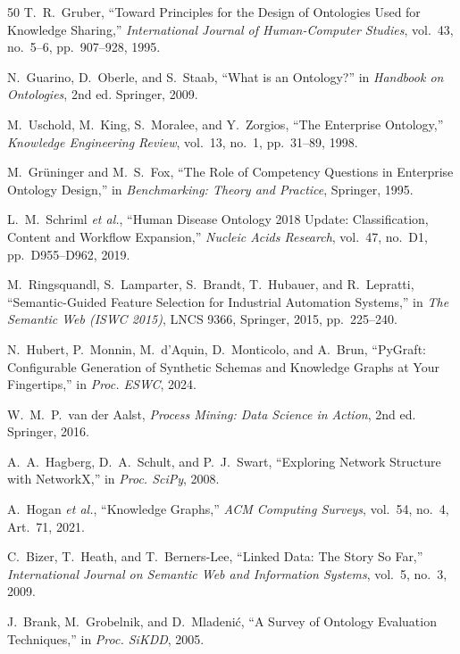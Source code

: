 \documentclass{ieeeaccess}
\begin{document}
\begin{thebibliography}{50}
T.~R.~Gruber, ``Toward Principles for the Design of Ontologies Used for Knowledge Sharing,'' \textit{International Journal of Human-Computer Studies}, vol.~43, no.~5--6, pp.~907--928, 1995.

N.~Guarino, D.~Oberle, and S.~Staab, ``What is an Ontology?'' in \textit{Handbook on Ontologies}, 2nd ed. Springer, 2009.

M.~Uschold, M.~King, S.~Moralee, and Y.~Zorgios, ``The Enterprise Ontology,'' \textit{Knowledge Engineering Review}, vol.~13, no.~1, pp.~31--89, 1998.

M.~Gr\"{u}ninger and M.~S.~Fox, ``The Role of Competency Questions in Enterprise Ontology Design,'' in \textit{Benchmarking: Theory and Practice}, Springer, 1995.

L.~M.~Schriml \textit{et al.}, ``Human Disease Ontology 2018 Update: Classification, Content and Workflow Expansion,'' \textit{Nucleic Acids Research}, vol.~47, no.~D1, pp.~D955--D962, 2019.

M.~Ringsquandl, S.~Lamparter, S.~Brandt, T.~Hubauer, and R.~Lepratti, ``Semantic-Guided Feature Selection for Industrial Automation Systems,'' in \textit{The Semantic Web (ISWC 2015)}, LNCS 9366, Springer, 2015, pp.~225--240.

N.~Hubert, P.~Monnin, M.~d'Aquin, D.~Monticolo, and A.~Brun, ``PyGraft: Configurable Generation of Synthetic Schemas and Knowledge Graphs at Your Fingertips,'' in \textit{Proc. ESWC}, 2024.

W.~M.~P.~van der Aalst, \textit{Process Mining: Data Science in Action}, 2nd ed. Springer, 2016.

A.~A.~Hagberg, D.~A.~Schult, and P.~J.~Swart, ``Exploring Network Structure with NetworkX,'' in \textit{Proc. SciPy}, 2008.

A.~Hogan \textit{et al.}, ``Knowledge Graphs,'' \textit{ACM Computing Surveys}, vol.~54, no.~4, Art.~71, 2021.

C.~Bizer, T.~Heath, and T.~Berners-Lee, ``Linked Data: The Story So Far,'' \textit{International Journal on Semantic Web and Information Systems}, vol.~5, no.~3, 2009.

J.~Brank, M.~Grobelnik, and D.~Mladeni\'{c}, ``A Survey of Ontology Evaluation Techniques,'' in \textit{Proc. SiKDD}, 2005.


\end{thebibliography}
\end{document}
